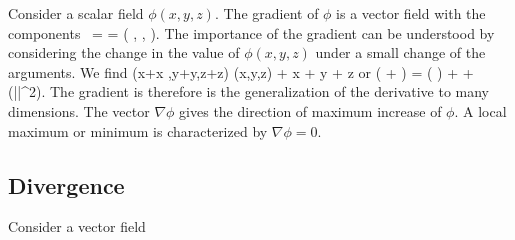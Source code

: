 \documentclass[a4paper,11pt]{article}
\begin{document}
Consider a scalar field $\phi(x,y,z)$. The gradient of $\phi$ is a vector field with the components
\be
{}\, \phi = \nabla \phi = \left( , ,  \right).
\ee
The importance of the gradient can be understood by considering the change in the value of $\phi(x,y,z)$ under a small change of the arguments. We find
\be
\phi(x+\delta x ,y+\delta y,z+\delta z) \approx \phi(x,y,z) +  \delta x +   \delta y +  \delta z
\ee
or
\be
\phi( \xvec + \delta \xvec ) = \phi( \xvec ) + \nabla\phi\cdot \delta\xvec + (|\delta\xvec|^2).
\ee
The gradient is therefore is the generalization of the derivative to many dimensions. The vector $\nabla \phi$ gives the direction of maximum increase of $\phi$. A local maximum or minimum is characterized by $\nabla \phi  = 0$.

\subsection{Divergence}

Consider a vector field 
\end{document}
